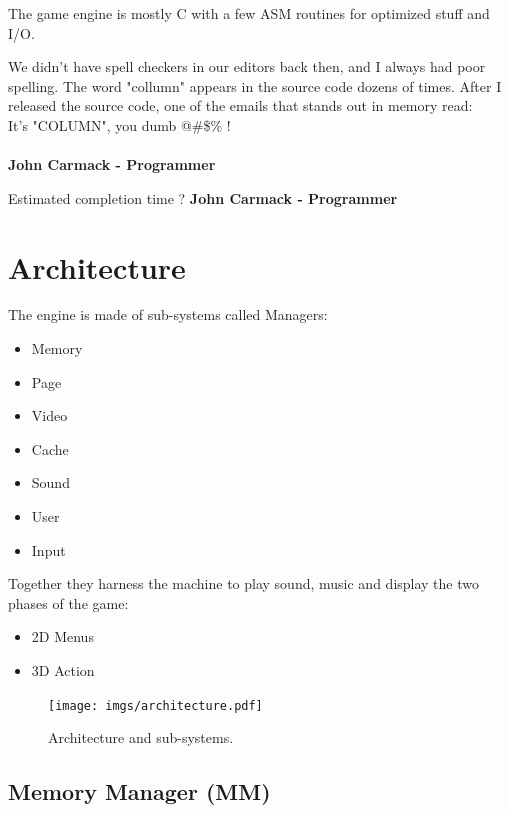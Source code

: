 \documentclass[book.tex]{subfiles}
\begin{document}
The game engine is mostly C with a few ASM routines for optimized stuff and I/O.\\


 \begin{fancyquotes}
   We didn't have spell checkers in our editors back then, and I always had poor spelling.  The word "collumn" appears in the source code dozens of times.  After I released the source code, one of the emails that stands out in memory read:
 \bigskip \\
It's "COLUMN", you dumb @\#\$\% !\\
 \bigskip \\
\textbf{John Carmack - Programmer}
 \end{fancyquotes}

\begin{fancyquotes}
Estimated completion time ?  
\textbf{John Carmack - Programmer}
 \end{fancyquotes}
 
\section{Architecture}

The engine is made of sub-systems called Managers:
\begin{itemize}
	\item Memory
	\item Page
	\item Video
	\item Cache
	\item Sound
	\item User
	\item Input
\end{itemize}
Together they harness the machine to play sound, music and display the two phases of the game:
\begin{itemize}
	\item 2D Menus
	\item 3D Action
\end{itemize}


\begin{figure}[H]
\centering
\texttt{[image: imgs/architecture.pdf]}
\caption{Architecture and sub-systems.}
\label{fig:architecture}
\end{figure}


\subsection{Memory Manager (MM)}
\end{document}
